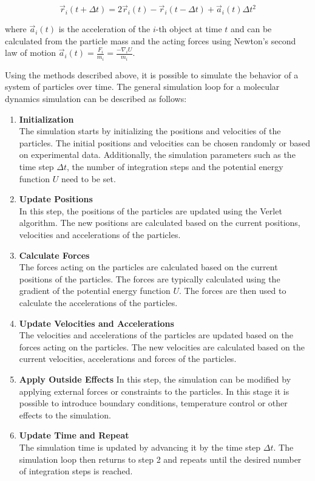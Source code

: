 \begin{equation}
      \vec{r}_i(t + \Delta t) = 2 \vec{r}_i(t) - \vec{r}_i(t - \Delta t) + \vec{a}_i(t) \Delta t^2
\end{equation}

where $\vec{a}_i(t)$ is the acceleration of the $i$-th object at time $t$ and can be calculated from the particle mass and the acting forces using Newton's second law of motion $\vec{a}_i(t) =\frac{F_i}{m_i}= \frac{-\nabla_i U}{m_i}$.


Using the methods described above, it is possible to simulate the behavior of a system of particles over time. The general simulation loop for a molecular dynamics simulation can be described as follows:

\begin{enumerate}
      \item \textbf{Initialization} \\
            The simulation starts by initializing the positions and velocities of the particles. The initial positions and velocities can be chosen randomly or based on experimental data. Additionally, the simulation parameters such as the time step $\Delta t$, the number of integration steps and the potential energy function $U$ need to be set.

      \item \textbf{Update Positions} \\
            In this step, the positions of the particles are updated using the Verlet algorithm. The new positions are calculated based on the current positions, velocities and accelerations of the particles.

      \item \textbf{Calculate Forces} \\
            The forces acting on the particles are calculated based on the current positions of the particles. The forces are typically calculated using the gradient of the potential energy function $U$. The forces are then used to calculate the accelerations of the particles.

      \item \textbf{Update Velocities and Accelerations} \\
            The velocities and accelerations of the particles are updated based on the forces acting on the particles. The new velocities are calculated based on the current velocities, accelerations and forces of the particles.

      \item \textbf{Apply Outside Effects}
            In this step, the simulation can be modified by applying external forces or constraints to the particles. In this stage it is possible to introduce boundary conditions, temperature control or other effects to the simulation.

      \item \textbf{Update Time and Repeat} \\
            The simulation time is updated by advancing it by the time step $\Delta t$. The simulation loop then returns to step 2 and repeats until the desired number of integration steps is reached.
\end{enumerate}


